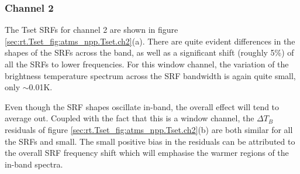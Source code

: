 \subsubsection{Channel 2}
The Tset SRFs for channel 2 are shown in figure \ref{sec:rt.Tset_fig:atms_npp.Tset.ch2}(a). There are quite evident differences in the shapes of the SRFs across the band, as well as a significant shift (roughly 5\%) of all the SRFs to lower frequencies. For this window channel, the variation of the brightness temperature spectrum across the SRF bandwidth is again quite small, only $\sim$0.01K.

Even though the SRF shapes oscillate in-band, the overall effect will tend to average out. Coupled with the fact that this is a window channel, the $\Delta T_B$ residuals of figure \ref{sec:rt.Tset_fig:atms_npp.Tset.ch2}(b) are both similar for all the SRFs and small. The small positive bias in the residuals can be attributed to the overall SRF frequency shift which will emphasise the warmer regions of the in-band spectra.
